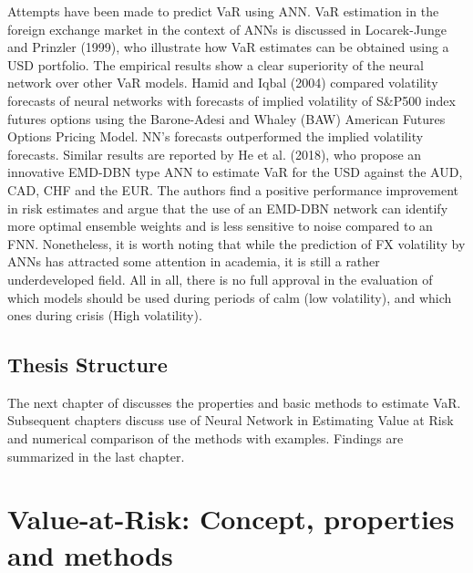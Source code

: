 \documentclass[a4paper,11pt,oneside]{book}
\begin{document}
Attempts have been made to predict VaR using ANN. VaR estimation in the foreign exchange market in the context of ANNs is discussed in
Locarek-Junge and Prinzler (1999), who illustrate how VaR estimates can be obtained using a USD portfolio. The empirical results show a clear superiority of the neural network over other VaR models. Hamid and Iqbal (2004) compared volatility forecasts of neural networks with forecasts of implied volatility of S\&P500 index futures options using the Barone-Adesi and Whaley (BAW) American Futures Options Pricing Model. NN's forecasts outperformed the implied volatility forecasts. Similar results are reported by He et al.
(2018), who propose an innovative EMD-DBN type ANN to estimate VaR for the
USD against the AUD, CAD, CHF and the EUR. The authors find a positive performance improvement in risk estimates and argue that the use of an
EMD-DBN network can identify more optimal ensemble weights and is less sensitive to noise compared to an FNN. Nonetheless, it is worth noting that while the prediction of FX volatility by ANNs has attracted some attention in academia, it is still a rather underdeveloped field.
\newline\newline
All in all, there is no full approval in the evaluation of which models should be used during
periods of calm (low volatility), and which ones during crisis (High volatility).


\section{Thesis Structure}
The next chapter of discusses the properties and basic methods to estimate VaR. Subsequent chapters discuss use of Neural Network in Estimating Value at Risk and numerical comparison of the methods with examples. Findings are summarized in the last chapter.




\chapter{Value-at-Risk: Concept,  properties and methods}
\end{document}

